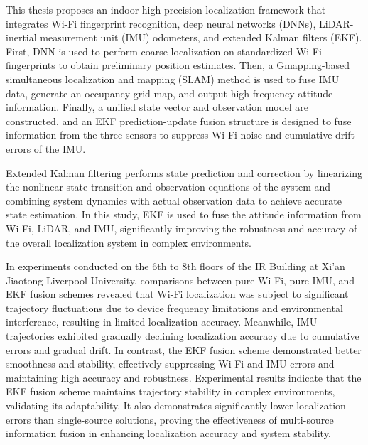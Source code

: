 \documentclass[12pt,a4paper]{article}
\numberwithin{equation}{section}
\begin{document}
\noindent This thesis proposes an indoor high-precision localization framework that integrates Wi-Fi fingerprint recognition, deep neural networks (DNNs), LiDAR-inertial measurement unit (IMU) odometers, and extended Kalman filters (EKF). First, DNN is used to perform coarse localization on standardized Wi-Fi fingerprints to obtain preliminary position estimates. Then, a Gmapping-based simultaneous localization and mapping (SLAM) method is used to fuse IMU data, generate an occupancy grid map, and output high-frequency attitude information. Finally, a unified state vector and observation model are constructed, and an EKF prediction-update fusion structure is designed to fuse information from the three sensors to suppress Wi-Fi noise and cumulative drift errors of the IMU.


\noindent Extended Kalman filtering performs state prediction and correction by linearizing the nonlinear state transition and observation equations of the system and combining system dynamics with actual observation data to achieve accurate state estimation. In this study, EKF is used to fuse the attitude information from Wi-Fi, LiDAR, and IMU, significantly improving the robustness and accuracy of the overall localization system in complex environments.

\noindent In experiments conducted on the 6th to 8th floors of the IR Building at Xi'an Jiaotong-Liverpool University, comparisons between pure Wi-Fi, pure IMU, and EKF fusion schemes revealed that Wi-Fi localization was subject to significant trajectory fluctuations due to device frequency limitations and environmental interference, resulting in limited localization accuracy. Meanwhile, IMU trajectories exhibited gradually declining localization accuracy due to cumulative errors and gradual drift. In contrast, the EKF fusion scheme demonstrated better smoothness and stability, effectively suppressing Wi-Fi and IMU errors and maintaining high accuracy and robustness. Experimental results indicate that the EKF fusion scheme maintains trajectory stability in complex environments, validating its adaptability. It also demonstrates significantly lower localization errors than single-source solutions, proving the effectiveness of multi-source information fusion in enhancing localization accuracy and system stability.
\end{document}
